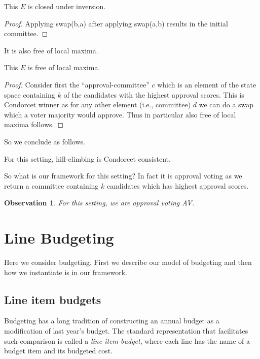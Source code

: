 \documentclass[sigconf]{aamas}  %
\newtheorem{observation}{Observation}
\begin{document}
\begin{lemma}
  This $E$ is closed under inversion.
\end{lemma}

\begin{proof}
Applying swap(b,a) after applying swap(a,b) results in the initial committee.
\end{proof}

It is also free of local maxima.

\begin{lemma}
  This $E$ is free of local maxima.
\end{lemma}

\begin{proof}
%
Consider first the ``approval-committee'' $c$ which is an element of the state space containing $k$ of the candidates with the highest approval scores.
This is Condorcet winner as for any other element (i.e., committee) $d$ we can do a swap which a voter majority would approve. Thus in particular also free of local maxima follows.
%
\end{proof}

So we conclude as follows.

\begin{corollary}
  For this setting, hill-climbing is Condorcet consistent.
\end{corollary}

So what is our framework for this setting? In fact it is approval voting as we return a committee containing $k$ candidates which has highest approval scores.

\begin{observation}
For this setting, we are approval voting AV.
\end{observation}


\section{Line Budgeting}
\label{section:e-process budgeting}

Here we consider budgeting. First we describe our model of budgeting and then how we instantiate is in our framework.


\subsection{Line item budgets}

Budgeting has a long tradition of constructing an annual budget as a modification of last year's budget.  The standard representation that facilitates such comparison is called a \emph{line item budget}, where each line has the name of a budget item and its budgeted cost.
\end{document}
